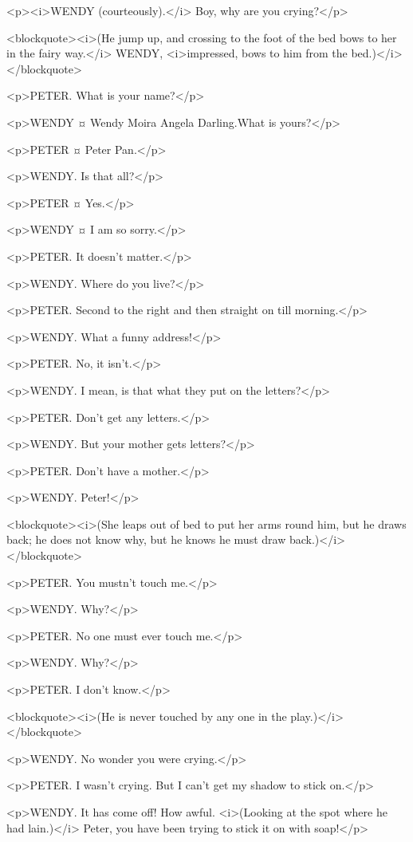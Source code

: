 <p><i>WENDY (courteously).</i> Boy, why are you crying?</p>

<blockquote><i>(He jump up, and crossing to the foot of the bed bows to her in the fairy way.</i> WENDY, <i>impressed, bows to him from the bed.)</i></blockquote>

<p>PETER. What is your name?</p>

<p>WENDY ¤
Wendy Moira Angela Darling.What is yours?</p>

<p>PETER ¤
Peter Pan.</p>

<p>WENDY. Is that all?</p>

<p>PETER ¤
Yes.</p>

<p>WENDY ¤
I am so sorry.</p>

<p>PETER. It doesn't matter.</p>

<p>WENDY. Where do you live?</p>

<p>PETER. Second to the right and then straight on till morning.</p>

<p>WENDY. What a funny address!</p>

<p>PETER. No, it isn't.</p>

<p>WENDY. I mean, is that what they put on the letters?</p>

<p>PETER. Don't get any letters.</p>

<p>WENDY. But your mother gets letters?</p>

<p>PETER. Don't have a mother.</p>

<p>WENDY. Peter!</p>

<blockquote><i>(She leaps out of bed to put her arms round him, but he draws back; he does not know why, but he knows he must draw back.)</i></blockquote>

<p>PETER. You mustn't touch me.</p>

<p>WENDY. Why?</p>

<p>PETER. No one must ever touch me.</p>

<p>WENDY. Why?</p>

<p>PETER. I don't know.</p>

<blockquote><i>(He is never touched by any one in the play.)</i></blockquote>

<p>WENDY. No wonder you were crying.</p>

<p>PETER. I wasn't crying. But I can't get my shadow to stick on.</p>

<p>WENDY. It has come off! How awful. <i>(Looking at the spot where he had lain.)</i> Peter, you have been trying to stick it on with soap!</p>


